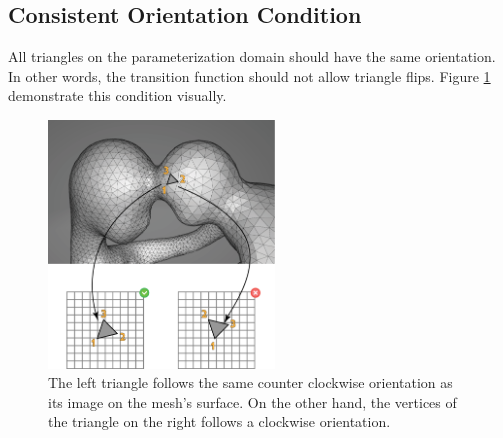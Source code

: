 \subsection{Consistent Orientation Condition}
\label{label:consistent_otrientation_cond}
All triangles on the parameterization domain should have the same orientation. In other words, the transition function should not allow triangle flips. Figure \ref{fig:orientation_req} demonstrate this condition visually.
\begin{figure}[ht]
\centering
\includegraphics[width=6cm]{figures/orientation/orientation.png}
\caption[The Orientation Requirement]{The left triangle follows the same counter clockwise orientation as its image on the mesh's surface. On the other hand, the vertices of the triangle on the right follows a clockwise orientation.}
\label{fig:orientation_req}
\end{figure}
